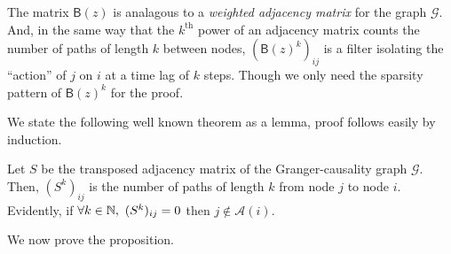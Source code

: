 \documentclass[12pt]{article}
\def\gcg{\mathcal{G}}  %
\def\B{\mathsf{B}}  %
\def\wtB{\widetilde{\B}}  %
\newcommand{\pa}[1]{pa(#1)}  %
\newcommand{\anc}[1]{\mathcal{A}(#1)}  %
\newcommand{\gpn}[2]{gp_{#1}(#2)}  %
\begin{document}




The matrix $\B(z)$ is analagous to a \textit{weighted adjacency
  matrix} for the graph $\gcg$.  And, in the same way that the
$k^{\text{th}}$ power of an adjacency matrix counts the number of
paths of length $k$ between nodes, $(\B(z)^k)_{ij}$ is a filter
isolating the ``action'' of $j$ on $i$ at a time lag of $k$ steps.
Though we only need the sparsity pattern of $\B(z)^k$ for the proof.

We state the following well known theorem as a lemma, proof follows
easily by induction.

\begin{lemma}
  \label{lem:adj_matrix}
  Let $S$ be the transposed adjacency matrix of the Granger-causality
  graph $\gcg$.  Then, $(S^k)_{ij}$ is the number of paths of length
  $k$ from node $j$ to node $i$.  Evidently, if
  $\forall k \in \mathbb{N},\ (S^k)_{ij} = 0$ then $j \not\in \anc{i}$.
\end{lemma}

We now prove the proposition.
\end{document}
